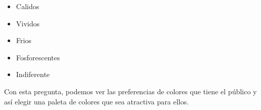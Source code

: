 
\begin{itemize}
    \item Calidos
    \item Vividos
    \item Frios
    \item Fosforescentes
    \item Indiferente 
\end{itemize}

Con esta pregunta, podemos ver las preferencias de colores que tiene el público y así elegir una paleta de colores que sea atractiva para ellos.